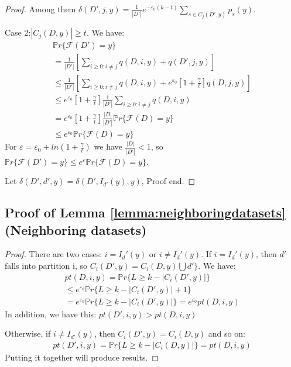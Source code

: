 \begin{proof}
Among them $\delta (D',j,y) = \frac{1}{|D'|} e^{-\varepsilon_0(k-t)}\sum_{s\in C_j(D',y)}p_s(y)$.

Case 2:$|C_j(D,y)| \geq t$. We have:
			\begin{equation}
	\begin{aligned}
	\mathbb{P}r\{ \mathcal{F}(D') = y\}  \\
	= \frac{1}{|D'|}[\sum_{i\geq 0:i\neq j} q(D,i,y)+q(D',j,y)] \\
	\leq \frac{1}{|D'|}[\sum_{i\geq 0:i\neq j} q(D,i,y)+e^{\varepsilon_0}[1+\frac{\gamma}{t}]q(D,j,y)] \\
	\leq e^{\varepsilon_0} [1+\frac{\gamma}{t}]\frac{1}{|D'|}\sum_{i\geq 0:i\neq j} q(D,i,y)\\
	= e^{\varepsilon_0} [1+\frac{\gamma}{t}]\frac{|D|}{|D'|} \mathbb{P}r\{ \mathcal{F}(D) = y\}\\
	\leq e^{\varepsilon_0}  \mathbb{P}r\{ \mathcal{F}(D) = y\}
	\end{aligned}
	\end{equation}
	For $\varepsilon=  \varepsilon_0+ ln(1 +\frac{\gamma}{t} )$ we have $\frac{|D|}{|D'|} <1$, so $\mathbb{P}r\{ \mathcal{F}(D') = y\} \leq e^{\varepsilon} \mathbb{P}r\{ \mathcal{F}(D) = y\}$.
	
	Let   $\delta(D',d',y)=\delta(D',I_{d'}(y),y)$,
	Proof end.
\end{proof}

\subsection{Proof of Lemma \ref{lemma:neighboringdatasets} (Neighboring datasets)}\label{Lemma:proofofneighbor}
\begin{proof}
	There are two cases: $ i = I_d '(y) $ or $ i \neq I_d' (y) $. If $ i = I_d '(y) $, then $ d' $ falls into partition i, so $ C_i (D', y) = C_i (D, y) \bigcup d' \} $. We have:
		\begin{equation}
	\begin{aligned}
	pt(D, i, y) = \mathbb{P}r \{ L \geq k - |C_i(D',y)|\}  \\
	\leq e^{\varepsilon_0} \mathbb{P}r \{ L \geq k - |C_i(D',y)|+1\} \\
	= e^{\varepsilon_0}  \mathbb{P}r \{ L \geq k - |C_i(D',y)|\} = e^{\varepsilon_0} pt(D,i,y)
	\end{aligned}
	\end{equation}
	In addition, we have this: $pt(D', i, y) > pt(D, i, y)$ 
	
	Otherwise, if $ i \neq I_{d '} (y) $, then $ C_i (D', y) = C_i (D, y) $ and so on:
		\begin{equation}
	\begin{aligned}
	pt(D', i, y) = \mathbb{P}r \{ L \geq k - |C_i(D,y)|\}  =  pt(D,i,y) 
	\end{aligned}
	\end{equation}
	Putting it together will produce results.
	
\end{proof}

